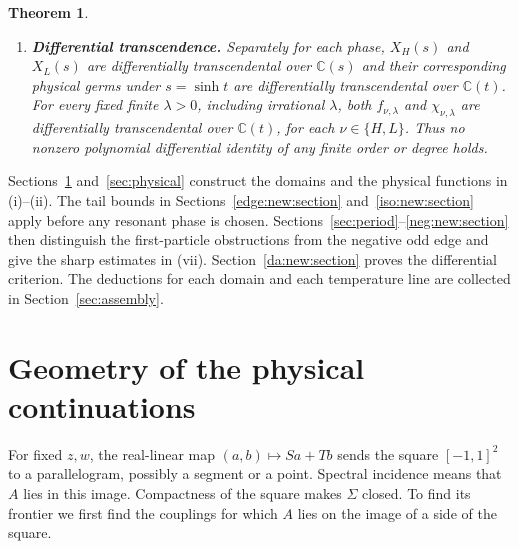 \documentclass[11pt]{article}
\numberwithin{equation}{section}
\newtheorem{theorem}{Theorem}[section]
\theoremstyle{definition}
\newcommand{\C}{\mathbb C}
\begin{document}
\begin{theorem}
\begin{enumerate}[label=\textup{(\roman*)},leftmargin=*]
At each selected noncollinear negative odd edge write $B=T/S$ and
$h=A/S+B$ in the transfer chart, and let $b$ be the value of $h$ at
the boundary point. In the edge coordinate $\tau=(h-b)/B$ the complete
boundary jet has indicator $4/(e\pi^2)$, with an upper bound at every
order and a matching lower subsequence for each family member.
Lemma~\ref{neg:new:transport} gives the exact transport under physical
factors and nonramified coordinates.
\item \textup{\textbf{Differential transcendence.}} Separately for each phase, $X_H(s)$ and $X_L(s)$ are
differentially transcendental over $\C(s)$ and their corresponding
physical germs under $s=\sinh t$ are differentially transcendental
over $\C(t)$. For every fixed finite $\lambda>0$, including irrational
$\lambda$, both $f_{\nu,\lambda}$ and $\chi_{\nu,\lambda}$ are
differentially transcendental over $\C(t)$, for each
$\nu\in\{H,L\}$. Thus no nonzero polynomial differential identity
of any finite order or degree holds.
\end{enumerate}
\end{theorem}

\endgroup

Sections~\ref{geo:new:section} and~\ref{sec:physical} construct the
domains and the physical functions in (i)--(ii). The tail bounds in
Sections~\ref{edge:new:section} and~\ref{iso:new:section} apply before
any resonant phase is chosen. Sections~\ref{sec:period}--\ref{neg:new:section}
then distinguish the first-particle obstructions from the negative
odd edge and give the sharp estimates in (vii).
Section~\ref{da:new:section} proves the differential criterion.
The deductions for each domain and each temperature line are collected
in Section~\ref{sec:assembly}.


\section{Geometry of the physical continuations}
\label{geo:new:section}

For fixed $z,w$, the real-linear map $(a,b)\mapsto Sa+Tb$ sends the
square $[-1,1]^2$ to a parallelogram, possibly a segment or a point.
Spectral incidence means that $A$ lies in this image. Compactness of
the square makes $\Sigma$ closed. To find its frontier we first find the
couplings for which $A$ lies on the image of a side of the square.
\end{document}
